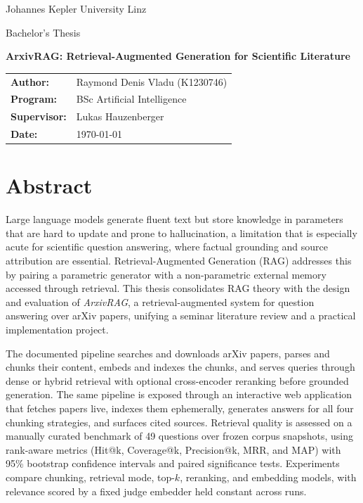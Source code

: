 \documentclass[12pt,a4paper,titlepage,oneside]{book}
\begin{document}
\begin{titlepage}
\centering
\vspace*{\fill}
{\huge Johannes Kepler University Linz\par}
\vspace{1cm}
{\Large Bachelor's Thesis\par}
\vspace{4.0cm}

{\Huge \textbf{ArxivRAG: Retrieval-Augmented Generation for Scientific Literature}\par}
\vspace{4.0cm}

\begin{center}
\large
\begin{tabular}{@{}l l@{}}
\textbf{Author:} & Raymond Denis Vladu (K1230746) \\
\textbf{Program:} & BSc Artificial Intelligence \\
\textbf{Supervisor:} & Lukas Hauzenberger \\
\textbf{Date:} & \today \\
\end{tabular}
\end{center}
\vspace*{\fill}
\end{titlepage}

\chapter*{Abstract}
Large language models generate fluent text but store knowledge in parameters that are hard to update and prone to hallucination, a limitation that is especially acute for scientific question answering, where factual grounding and source attribution are essential. Retrieval-Augmented Generation (RAG) addresses this by pairing a parametric generator with a non-parametric external memory accessed through retrieval. This thesis consolidates RAG theory with the design and evaluation of \textit{ArxivRAG}, a retrieval-augmented system for question answering over arXiv papers, unifying a seminar literature review and a practical implementation project.

The documented pipeline searches and downloads arXiv papers, parses and chunks their content, embeds and indexes the chunks, and serves queries through dense or hybrid retrieval with optional cross-encoder reranking before grounded generation. The same pipeline is exposed through an interactive web application that fetches papers live, indexes them ephemerally, generates answers for all four chunking strategies, and surfaces cited sources. Retrieval quality is assessed on a manually curated benchmark of 49 questions over frozen corpus snapshots, using rank-aware metrics (Hit@k, Coverage@k, Precision@k, MRR, and MAP) with 95\% bootstrap confidence intervals and paired significance tests. Experiments compare chunking, retrieval mode, top-$k$, reranking, and embedding models, with relevance scored by a fixed judge embedder held constant across runs.
\end{document}
